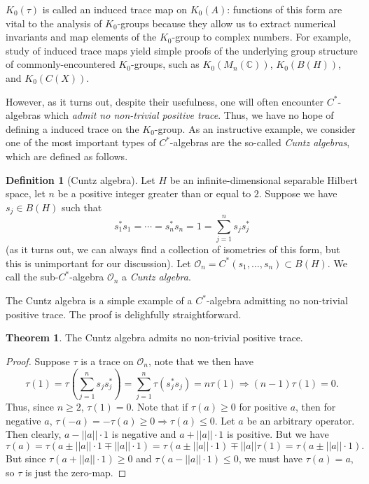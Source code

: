 \documentclass[aps,pra,showpacs,notitlepage,onecolumn,superscriptaddress,nofootinbib]{revtex4-1}
\theoremstyle{definition}
\newtheorem{definition}{Definition}[section]
\newtheorem{theorem}{Theorem}[section]
\begin{document}
\noindent $K_0(\tau)$ is called an induced trace map on $K_0(A)$: functions of this form are vital to the analysis of $K_0$-groups because they allow us to extract numerical invariants and map
elements of the $K_0$-group to complex numbers. For example, study of induced trace maps yield simple proofs of the underlying group structure of commonly-encountered $K_0$-groups,
such as $K_0(M_n(\mathbb{C}))$, $K_0(B(H))$, and $K_0(C(X))$.

However, as it turns out, despite their usefulness, one will often encounter $C^{*}$-algebras which \emph{admit no non-trivial positive trace}. Thus, we have no hope of defining a induced trace on the $K_0$-group.
As an instructive example, we consider one of the most important types of $C^{*}$-algebras are the so-called \emph{Cuntz algebras}, which are defined as follows.

\begin{definition}[Cuntz algebra]
  Let $H$ be an infinite-dimensional separable Hilbert space, let $n$ be a positive integer greater than or equal to $2$. Suppose we have $s_j \in B(H)$ such that
  \begin{equation}
    s_1^{*} s_1 = \cdots = s_n^{*} s_n = 1 = \displaystyle\sum_{j = 1}^{n} s_j s_j^{*}
  \end{equation}
  (as it turns out, we can always find a collection of isometries of this form, but this is unimportant for our discussion). Let $\mathcal{O}_n = C^{*}(s_1, \dots, s_n) \subset B(H)$.
  We call the sub-$C^{*}$-algebra $\mathcal{O}_n$ a \emph{Cuntz algebra}.
\end{definition}

\noindent The Cuntz algebra is a simple example of a $C^{*}$-algebra admitting no non-trivial positive trace. The proof is delighfully straightforward.

\begin{theorem}
  The Cuntz algebra admits no non-trivial positive trace.
\end{theorem}
\begin{proof}
  Suppose $\tau$ is a trace on $\mathcal{O}_n$, note that we then have
  \begin{equation}
    \tau(1) = \tau \left( \displaystyle\sum_{j = 1}^{n} s_j s_j^{*} \right) =  \displaystyle\sum_{j = 1}^{n} \tau(s_j^{*} s_j) = n \tau(1) \Longrightarrow (n - 1) \tau(1) = 0.
  \end{equation}
  Thus, since $n \geq 2$, $\tau(1) = 0$. Note that if $\tau(a) \geq 0$ for positive $a$, then for negative $a$, $\tau(-a) = - \tau(a) \geq 0 \Rightarrow \tau(a) \leq 0$.
  Let $a$ be an arbitrary operator. Then clearly, $a - ||a|| \cdot 1$ is negative and $a + ||a|| \cdot 1$ is positive. But we have
  \begin{equation}
    \tau(a) = \tau(a \pm ||a|| \cdot 1 \mp ||a|| \cdot 1) = \tau(a \pm ||a|| \cdot 1) \mp ||a|| \tau(1) = \tau(a \pm ||a|| \cdot 1).
  \end{equation}
  But since $\tau(a + ||a|| \cdot 1) \geq 0$ and $\tau(a - ||a|| \cdot 1) \leq 0$, we must have $\tau(a) = a$, so $\tau$ is just the zero-map.
  \end{proof}
\end{document}
